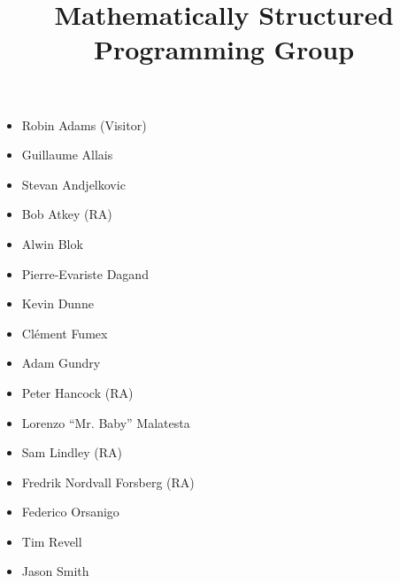 \documentclass{article}
\begin{document}
\title{\Huge \textbf{Mathematically Structured Programming Group}}

\date{}
\maketitle
\thispagestyle{empty} %

\begin{center}

%

\vskip -0.5cm
\large
\begin{itemize}
  \addtolength{\leftskip}{2cm}
  \item Robin Adams (Visitor)
  \item Guillaume Allais
  \item Stevan Andjelkovic
  \item Bob Atkey (RA)
  \item Alwin Blok
  \item Pierre-Evariste Dagand
  \item Kevin Dunne
  \item Cl\'{e}ment Fumex
  \item Adam Gundry
  \item Peter Hancock (RA)
  \item Lorenzo ``Mr. Baby'' Malatesta
  \item Sam Lindley (RA)
  \item Fredrik Nordvall Forsberg (RA)
  \item Federico Orsanigo
  \item Tim Revell
  \item Jason Smith
\end{itemize}
\vskip 1cm

\end{center}
\end{document}
